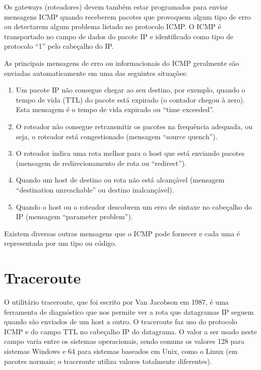 \documentclass[
	article,			%
	11pt,				%
	oneside,			%
	a4paper,			%
	english,			%
	brazil,				%
	sumario=tradicional
	]{abntex2}
\begin{document}
Os gateways (roteadores) devem também estar programados para enviar mensagens ICMP quando receberem pacotes que provoquem algum tipo de erro ou detectarem algum problema listado no protocolo ICMP. O ICMP é transportado no campo de dados do pacote IP e identificado como tipo de protocolo “1” pelo cabeçalho do IP.

As principais mensagens de erro ou informacionais do ICMP geralmente são enviadas automaticamente em uma das seguintes situações:
\begin{enumerate}
	\item Um pacote IP não consegue chegar ao seu destino, por exemplo, quando o tempo de vida (TTL) do pacote está expirado (o contador chegou à zero). Esta mensagem é o tempo de vida expirado ou “time exceeded”.
	
    \item O roteador não consegue retransmitir os pacotes na frequência adequada, ou seja, o roteador está congestionado (mensagem “source quench”).
    
    \item O roteador indica uma rota melhor para o host que está enviando pacotes (mensagem de redirecionamento de rota ou “redirect”).
 
	\item Quando um host de destino ou rota não está alcançável (mensagem “destination unreachable” ou destino inalcançável).

	\item Quando o host ou o roteador descobrem um erro de sintaxe no cabeçalho do IP (mensagem “parameter problem”). 
\end{enumerate}

Existem diversas outras mensagens que o ICMP pode fornecer e cada uma é representada por um tipo ou código.\cite{dltec}


\section{Traceroute}
O utilitário traceroute, que foi escrito por Van Jacobson em 1987, é uma ferramenta de diagnóstico que nos permite ver a rota que datagramas IP seguem quando são enviados de um host a outro. O traceroute faz uso do protocolo ICMP e do campo TTL no cabeçalho IP do datagrama. O valor a ser usado neste campo varia entre os sistemas operacionais, sendo comuns os valores 128 para sistemas Windows e 64 para sistemas baseados em Unix, como o Linux (em pacotes normais; o traceroute utiliza valores totalmente diferentes).
\end{document}
